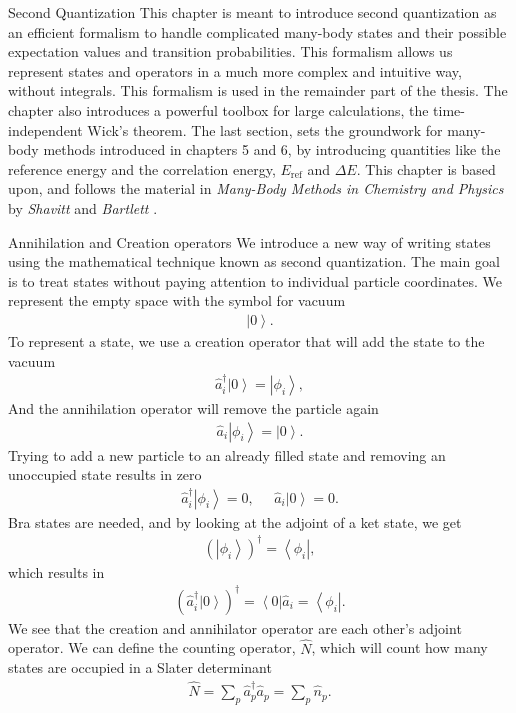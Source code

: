 \documentclass[twoside,english]{uiofysmaster}
\begin{document}
\begin{chapter}{Second Quantization}
 	This chapter is meant to introduce  second quantization as an efficient formalism to handle complicated many-body states and their possible expectation values and transition probabilities. This
        formalism allows us represent states and operators in a much more
        complex and intuitive way, without integrals. This formalism
        is used in the remainder part of the thesis. The chapter also
        introduces a powerful toolbox for large calculations, the
        time-independent Wick's theorem. The last section, sets the
        groundwork for many-body methods introduced in chapters 5 and
        6, by introducing quantities like the  reference energy and the correlation energy,
        $E_{\text{ref}}$ and $\Delta E$. This chapter is based upon,
        and follows the material in \textit{Many-Body Methods in
          Chemistry and Physics} by \textit{Shavitt} and
        \textit{Bartlett} \cite{ShavittAndBartlett}.
	\begin{section}{Annihilation and Creation operators}
		We introduce a new way of writing states using the mathematical technique known as second quantization. The main goal is to treat states without paying attention
		to individual particle coordinates. We represent the empty space with the symbol for vacuum
		\begin{align}
			\left| 0 \right>.
		\end{align}
		To represent a state, we use a creation operator that will add the state to the vacuum
		\begin{align}
			\hat a_i^{\dagger} \left| 0 \right> = \left| \phi_i \right>,
		\end{align}
		And the annihilation operator will remove the particle again
		\begin{align}
			\hat a_i \left| \phi_i \right> = \left| 0 \right> .
		\end{align}
		Trying to add a new particle to an already filled state and removing an unoccupied state results in zero
		\begin{align}
			\hat a_i^{\dagger} \left| \phi_i \right> = 0, \;\;\;\;\; \hat a_i \left| 0 \right> = 0.
		\end{align}
		Bra states are needed, and by looking at the adjoint of a ket state, we get
		\begin{align}
			\left(\left| \phi_i \right> \right)^\dagger = \left< \phi_i \right| ,
		\end{align}
		which results in
		\begin{align}
			\left( \hat a_i^\dagger \left| 0 \right> \right)^\dagger = \left< 0 \right| \hat a_i = \left< \phi_i \right|.
		\end{align}
		We see that the creation and annihilator operator are each other's adjoint operator. We can define the counting operator, $\hat N$, which will count how many states are occupied in a Slater determinant
		\begin{align}
			\hat N = \sum_p \hat a^\dagger_p \hat a_p = \sum_p \hat n_p.
		\end{align}
	\end{section}


\end{chapter}
\end{document}
